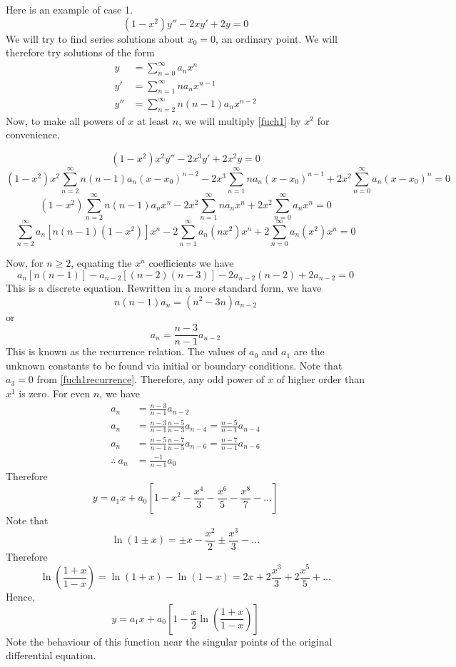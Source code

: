 \begin{example}
	Here is an example of case 1.
	\begin{equation}\label{fuch1}
		(1-x^2)y'' - 2xy' + 2y = 0
	\end{equation}
	We will try to find series solutions about \(x_0=0\), an ordinary point.
	We will therefore try solutions of the form
	\begin{align*}
		y   & = \sum_{n=0}^\infty a_n x^n           \\
		y'  & = \sum_{n=1}^\infty na_n x^{n-1}      \\
		y'' & = \sum_{n=2}^\infty n(n-1)a_n x^{n-2}
	\end{align*}
	Now, to make all powers of \(x\) at least \(n\), we will multiply \eqref{fuch1} by \(x^2\) for convenience.

	\[
		(1-x^2)x^2y'' - 2x^3y' + 2x^2y = 0
	\]
	\[
		(1-x^2)x^2\sum_{n=2}^\infty n(n-1)a_n(x-x_0)^{n-2} - 2x^3\sum_{n=1}^\infty na_n(x-x_0)^{n-1} + 2x^2\sum_{n=0}^\infty a_n(x-x_0)^n = 0
	\]
	\[
		(1-x^2)\sum_{n=2}^\infty n(n-1)a_n x^n - 2x^2\sum_{n=1}^\infty na_n x^n + 2x^2\sum_{n=0}^\infty a_n x^n = 0
	\]
	\[
		\sum_{n=2}^\infty a_n[n(n-1)(1-x^2)]x^n - 2\sum_{n=1}^\infty a_n(nx^2)x^n + 2\sum_{n=0}^\infty a_n(x^2)x^n = 0
	\]

	Now, for \(n \geq 2\), equating the \(x^n\) coefficients we have
	\[
		a_n[n(n-1)] - a_{n-2}[(n-2)(n-3)] - 2a_{n-2}(n-2) + 2a_{n-2} = 0
	\]
	This is a discrete equation.
	Rewritten in a more standard form, we have
	\[
		n(n-1)a_n = (n^2 - 3n)a_{n-2}
	\]
	or
	\begin{equation}\label{fuch1recurrence}
		a_n = \frac{n-3}{n-1}a_{n-2}
	\end{equation}
	This is known as the recurrence relation.
	The values of \(a_0\) and \(a_1\) are the unknown constants to be found via initial or boundary conditions.
	Note that \(a_3 = 0\) from \eqref{fuch1recurrence}.
	Therefore, any odd power of \(x\) of higher order than \(x^1\) is zero.
	For even \(n\), we have
	\begin{align*}
		a_n            & = \frac{n-3}{n-1}a_{n-2}                                         \\
		a_n            & = \frac{n-3}{n-1}\frac{n-5}{n-3}a_{n-4} = \frac{n-5}{n-1}a_{n-4} \\
		a_n            & = \frac{n-5}{n-1}\frac{n-7}{n-5}a_{n-6} = \frac{n-7}{n-1}a_{n-6} \\
		\therefore\ a_n & = \frac{-1}{n-1}a_0
	\end{align*}
	Therefore
	\[
		y = a_1 x + a_0\left[ 1 - x^2 - \frac{x^4}{3} - \frac{x^6}{5} - \frac{x^8}{7} - \dots \right]
	\]
	Note that
	\[
		\ln(1 \pm x) = \pm x - \frac{x^2}{2} \pm \frac{x^3}{3} - \dots
	\]
	Therefore
	\[
		\ln(\frac{1+x}{1-x}) = \ln(1+x) - \ln(1-x) = 2x + 2\frac{x^3}{3} + 2\frac{x^5}{5} + \dots
	\]
	Hence,
	\[
		y = a_1x + a_0\left[ 1-\frac{x}{2}\ln\left( \frac{1+x}{1-x} \right) \right]
	\]
	Note the behaviour of this function near the singular points of the original differential equation.
\end{example}
